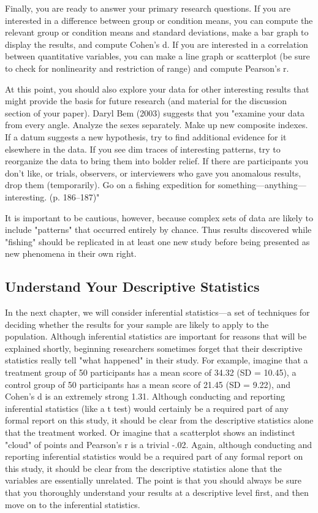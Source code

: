 Finally, you are ready to answer your primary research questions. If you are interested in a difference between group or condition means, you can compute the relevant group or condition means and standard deviations, make a bar graph to display the results, and compute Cohen's d. If you are interested in a correlation between quantitative variables, you can make a line graph or scatterplot (be sure to check for nonlinearity and restriction of range) and compute Pearson's r.

At this point, you should also explore your data for other interesting results that might provide the basis for future research (and material for the discussion section of your paper). Daryl Bem (2003) suggests that you "examine your data from every angle. Analyze the sexes separately. Make up new composite indexes. If a datum suggests a new hypothesis, try to find additional evidence for it elsewhere in the data. If you see dim traces of interesting patterns, try to reorganize the data to bring them into bolder relief. If there are participants you don't like, or trials, observers, or interviewers who gave you anomalous results, drop them (temporarily). Go on a fishing expedition for something---anything---interesting. (p. 186–187)"


It is important to be cautious, however, because complex sets of data are likely to include "patterns" that occurred entirely by chance. Thus results discovered while "fishing" should be replicated in at least one new study before being presented as new phenomena in their own right.

\subsection{Understand Your Descriptive Statistics}

In the next chapter, we will consider inferential statistics---a set of techniques for deciding whether the results for your sample are likely to apply to the population. Although inferential statistics are important for reasons that will be explained shortly, beginning researchers sometimes forget that their descriptive statistics really tell "what happened" in their study. For example, imagine that a treatment group of 50 participants has a mean score of 34.32 (SD = 10.45), a control group of 50 participants has a mean score of 21.45 (SD = 9.22), and Cohen's d is an extremely strong 1.31. Although conducting and reporting inferential statistics (like a t test) would certainly be a required part of any formal report on this study, it should be clear from the descriptive statistics alone that the treatment worked. Or imagine that a scatterplot shows an indistinct "cloud" of points and Pearson's r is a trivial -.02. Again, although conducting and reporting inferential statistics would be a required part of any formal report on this study, it should be clear from the descriptive statistics alone that the variables are essentially unrelated. The point is that you should always be sure that you thoroughly understand your results at a descriptive level first, and then move on to the inferential statistics.

